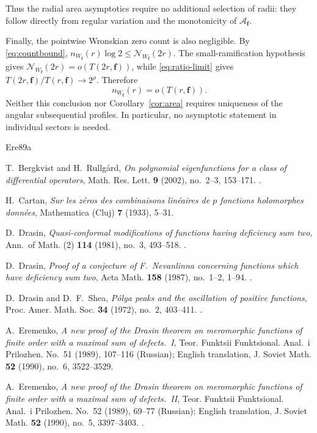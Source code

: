 \documentclass[12pt,letterpaper,reqno]{amsart}
\theoremstyle{definition}
\numberwithin{equation}{section}
\newcommand{\NN}{\mathcal N}
\newcommand{\fv}{\bm f}
\begin{document}
Thus the radial area asymptotics require no additional selection of
radii: they follow directly from regular variation and the monotonicity
of \(\mathcal A_{\fv}\).

Finally, the pointwise Wronskian zero count is also negligible. By
\eqref{eq:countbound},
\(n_{W_{\fv}}(r)\log2\leq
 \NN_{W_{\fv}}(2r)\).
The small-ramification hypothesis gives
\(\NN_{W_{\fv}}(2r)=o(T(2r,\fv))\), while
\eqref{eq:ratio-limit} gives
\(T(2r,\fv)/T(r,\fv)\to2^\rho\). Therefore
\[
n_{W_{\fv}}(r)=o(T(r,\fv)).
\]
Neither this conclusion nor Corollary~\ref{cor:area} requires
uniqueness of the angular subsequential profiles. In particular, no
asymptotic statement in individual sectors is needed.




\renewcommand{\bibliofont}{\fontsize{10}{11}\selectfont}
\begin{thebibliography}{Ere89a}
\raggedright

T.~Bergkvist and H.~Rullg\aa rd,
\emph{On polynomial eigenfunctions for a class of differential operators},
Math. Res. Lett. \textbf{9} (2002), no.~2--3, 153--171.
.

H.~Cartan,
\emph{Sur les z\'eros des combinaisons lin\'eaires de $p$ fonctions
holomorphes donn\'ees},
Mathematica (Cluj) \textbf{7} (1933), 5--31.

D.~Drasin,
\emph{Quasi-conformal modifications of functions having deficiency sum two},
Ann.\ of Math. (2) \textbf{114} (1981), no.~3, 493--518.
.

D.~Drasin,
\emph{Proof of a conjecture of F.~Nevanlinna concerning functions which
have deficiency sum two},
Acta Math. \textbf{158} (1987), no.~1--2, 1--94.
.

D.~Drasin and D.~F.~Shea,
\emph{P\'olya peaks and the oscillation of positive functions},
Proc. Amer. Math. Soc. \textbf{34} (1972), no.~2, 403--411.
.

A.~Eremenko,
\emph{A new proof of the Drasin theorem on meromorphic functions of finite
order with a maximal sum of defects.~I},
Teor. Funktsii Funktsional. Anal.\ i Prilozhen. No.~51 (1989), 107--116
(Russian); English translation, J. Soviet Math. \textbf{52} (1990),
no.~6, 3522--3529.

A.~Eremenko,
\emph{A new proof of the Drasin theorem on meromorphic functions of finite
order with a maximal sum of defects.~II},
Teor. Funktsii Funktsional. Anal.\ i Prilozhen. No.~52 (1989), 69--77
(Russian); English translation, J. Soviet Math. \textbf{52} (1990),
no.~5, 3397--3403.
.


\end{thebibliography}
\end{document}
